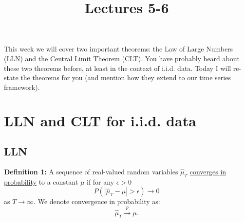 \documentclass[12] {article}
\begin{document}
\onehalfspace

\title{Lectures 5-6}
\date{}
\maketitle


This week we will cover two important theorems: the Law of Large Numbers (LLN) and the Central Limit Theorem (CLT). You have probably heard about these two theorems before, at least in the context of i.i.d. data. Today I will re-state the theorems for you (and mention how they extend to our time series framework).\\



 
 





\newpage

\section{LLN and CLT for i.i.d. data}


\subsection{LLN}

\textbf{Definition 1:} A sequence of real-valued random variables $\widehat{\mu}_T$ \underline{converges in probability} to a constant $\mu$ if for any $\epsilon>0$
\[ P ( | \widehat{\mu}_T - \mu | > \epsilon ) \rightarrow 0 \] 
as $T\rightarrow \infty$. We denote convergence in probability as:
\[ \widehat{\mu}_T \overset{p}{\rightarrow} \mu. \]
\end{document}
